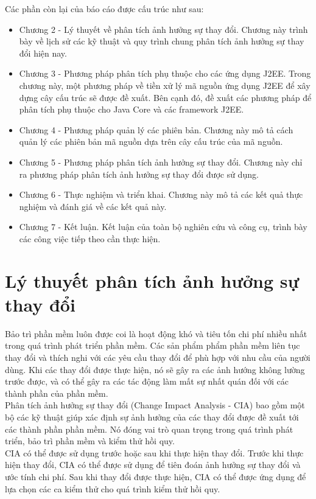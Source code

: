 \documentclass[12pt,a4paper]{report}
\begin{document}
Các phần còn lại của báo cáo được cấu trúc như sau:
\begin{itemize}
\item Chương 2 - Lý thuyết về phân tích ảnh hưởng sự thay đổi. Chương này trình bày về lịch sử các kỹ thuật và quy trình chung phân tích ảnh hưởng sự thay đổi hiện nay.
\item Chương 3 - Phương pháp phân tích phụ thuộc cho các ứng dụng J2EE. Trong chương này, một phương pháp về tiền xử lý mã nguồn ứng dụng J2EE để xây dựng cây cấu trúc sẽ được đề xuất. Bên cạnh đó, đề xuất các phương pháp để phân tích phụ thuộc cho Java Core và các framework J2EE.
\item Chương 4 - Phương pháp quản lý các phiên bản. Chương này mô tả cách quản lý các phiên bản mã nguồn dựa trên cây cấu trúc của mã nguồn.
\item Chương 5 - Phương pháp phân tích ảnh hưởng sự thay đổi. Chương này chỉ ra phương pháp phân tích ảnh hưởng sự thay đổi được sử dụng.
\item Chương 6 - Thực nghiệm và triển khai. Chương này mô tả các kết quả thực nghiệm và đánh giá về các kết quả này.
\item Chương 7 - Kết luận. Kết luận của toàn bộ nghiên cứu và công cụ, trình bày các công việc tiếp theo cần thực hiện.
\end{itemize}


\newpage	
\chapter{Lý thuyết phân tích ảnh hưởng sự thay đổi}
Bảo trì phần mềm luôn được coi là hoạt động khó và tiêu tốn chi phí nhiều nhất trong quá trình phát triển phần mềm. Các sản phẩm phẩm phần mềm liên tục thay đổi và thích nghi với các yêu cầu thay đổi để phù hợp với nhu cầu của người dùng. Khi các thay đổi được thực hiện, nó sẽ gây ra các ảnh hướng không lường trước được, và có thể gây ra các tác động làm mất sự nhất quán đối với các thành phần của phần mềm.\\

Phân tích ảnh hưởng sự thay đổi (Change Impact Analysis - CIA) bao gồm một bộ các kỹ thuật giúp xác định sự ảnh hưởng của các thay đổi được đề xuất tới các thành phần phần mềm. Nó đóng vai trò quan trọng trong quá trình phát triển, bảo trì phần mềm và kiểm thử hồi quy.\\

CIA có thể được sử dụng trước hoặc sau khi thực hiện thay đổi. Trước khi thực hiện thay đổi, CIA có thể được sử dụng để tiên đoán ảnh hưởng sự thay đổi và ước tính chi phí. Sau khi thay đổi được thực hiện, CIA có thể được ứng dụng để lựa chọn các ca kiểm thử cho quá trình kiểm thử hồi quy.\\
\end{document}
